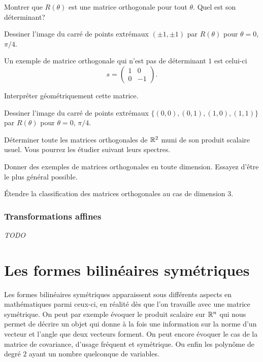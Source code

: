 \documentclass[11pt, a4paper]{article}
\begin{document}
\begin{question}
  Montrer que $R(\theta)$ est une matrice orthogonale pour tout
  $\theta$. Quel est son déterminant?
\end{question}
\begin{question}
  Dessiner l'image du carré de points extrémaux $(\pm 1, \pm 1)$ par
  $R(\theta)$ pour $\theta = 0$, $\pi/4$.
\end{question}
Un exemple de matrice orthogonale qui n'est pas de déterminant $1$ est
celui-ci
\[
s =
\begin{pmatrix}
1 & 0 \\
0 & -1
\end{pmatrix}.
\]
\begin{question}
  Interpréter géométriquement cette matrice.
\end{question}
\begin{question}
  Dessiner l'image du carré de points extrémaux
  $\{(0, 0), (0, 1), (1, 0), (1, 1)\}$
  par $R(\theta)$ pour $\theta = 0$, $\pi/4$.
\end{question}
\begin{question}
  Déterminer toute les matrices orthogonales de $\mathbb{R}^2$ muni de son
  produit scalaire usuel. Vous pourrez les étudier suivant leurs
  spectres.
\end{question}
\begin{question}
  Donner des exemples de matrices orthogonales en toute
  dimension. Essayez d'être le plus général possible.
\end{question}
\begin{question}
  Étendre la classification des matrices orthogonales au cas de
  dimension $3$.
\end{question}

\subsubsection{Transformations affines}

\emph{TODO}

\section{Les formes bilinéaires symétriques}
\label{sec:FBS}

Les formes bilinéaires symétriques apparaissent sous différents
aspects en mathématiques parmi ceux-ci, en réalité dès que l'on
travaille avec une matrice symétrique. On peut par exemple évoquer le
produit scalaire sur $\mathbb{R}^n$ qui nous permet de décrire un objet qui
donne à la fois une information sur la norme d'un vecteur et l'angle
que deux vecteurs forment. On peut encore évoquer le cas de la matrice
de covariance, d'usage fréquent et symétrique. Ou enfin les polynôme
de degré $2$ ayant un nombre quelconque de variables.
\end{document}
